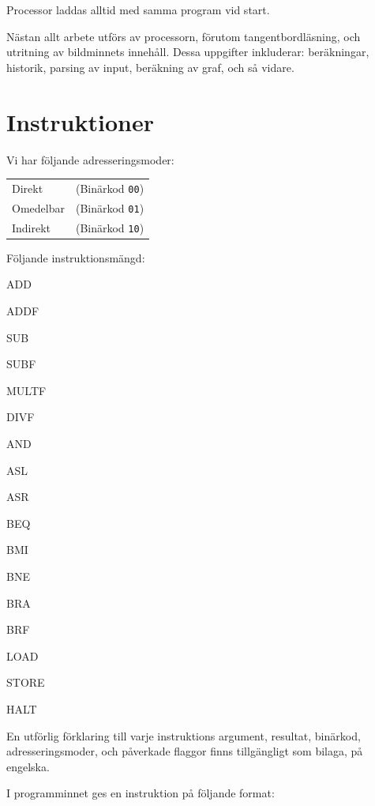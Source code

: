 \documentclass[]{article}
\begin{document}
Processor laddas alltid med samma program vid start. 

Nästan allt arbete utförs av processorn, förutom tangentbordläsning, och utritning av bildminnets innehåll. Dessa uppgifter inkluderar: beräkningar, historik, parsing av input, beräkning av graf, och så vidare.

\newpage

\section{Instruktioner}
Vi har följande adresseringsmoder:

\bigskip
\begin{tabular}{@{\textbullet\hspace*{\labelsep}}ll}
Direkt & (Binärkod \texttt{00}) \\
Omedelbar & (Binärkod \texttt{01}) \\
Indirekt & (Binärkod \texttt{10}) 
\end{tabular}
\bigskip

\noindent
Följande instruktionsmängd:

\begin{multicols}{5}
\begin{itemize*}
\item ADD
\item ADDF
\item SUB
\item SUBF
\item MULTF
\item DIVF
\item AND
\item ASL
\item ASR
\item BEQ
\item BMI
\item BNE
\item BRA
\item BRF
\item LOAD
\item STORE
\item HALT
\end{itemize*}
\end{multicols}

\noindent
En utförlig förklaring till varje instruktions argument, resultat, binärkod, adresseringsmoder, och påverkade flaggor finns tillgängligt som bilaga, på engelska.

I programminnet ges en instruktion på följande format:
\end{document}
